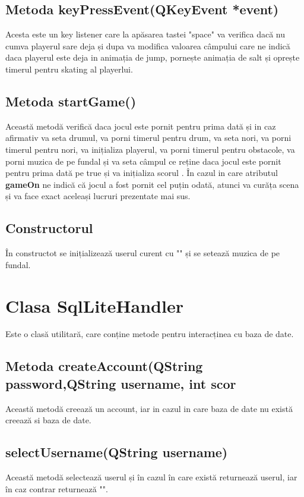 \documentclass{article}
\begin{document}
\subsection{Metoda keyPressEvent(QKeyEvent *event)}
Acesta este un key listener care la apăsarea tastei "space" va verifica dacă nu cumva playerul sare deja și dupa va modifica valoarea câmpului care ne indică daca playerul este deja in animația de jump, pornește animația de salt și oprește timerul pentru skating al playerlui.

\subsection{Metoda startGame()}
Această metodă verifică daca jocul este pornit pentru prima dată și in caz afirmativ va seta drumul, va porni timerul pentru drum, va seta nori, va porni timerul pentru nori, va inițializa playerul, va porni timerul pentru obstacole, va porni muzica de pe fundal și va seta câmpul ce reține daca jocul este pornit pentru prima dată pe true și va inițializa scorul . În cazul in care atributul \textbf{gameOn} ne indică că jocul a fost pornit cel puțin odată, atunci va curăța scena și va face exact aceleași lucruri prezentate mai sus.

\subsection{Constructorul}
În constructot se inițializează userul curent cu ""  și se setează muzica de pe fundal.

\section{Clasa SqlLiteHandler}
Este o clasă utilitară, care conține metode pentru interacținea cu baza de date.

\subsection{Metoda createAccount(QString password,QString username, int scor }
Această metodă creează un account, iar in cazul in care baza de date nu există creează si baza de date.

\subsection{selectUsername(QString username)}
Această metodă selectează userul și în cazul în care există returnează userul, iar în caz contrar returnează "".
\end{document}
